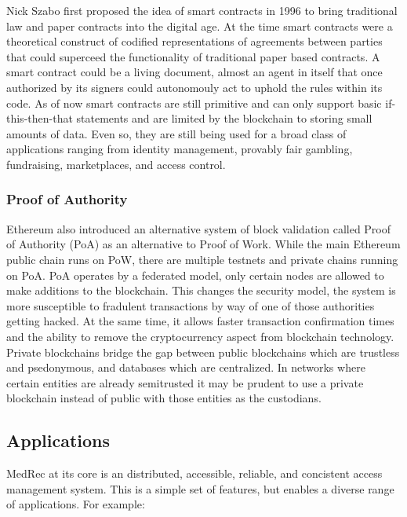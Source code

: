 \documentclass[a4paper]{article}
\begin{document}
Nick Szabo first proposed the idea of smart contracts in 1996 to bring traditional law and paper contracts into the digital age. At the time smart contracts were a theoretical construct of codified representations of agreements between parties that could superceed the functionality of traditional paper based contracts. A smart contract could be a living document, almost an agent in itself that once authorized by its signers could autonomouly act to uphold the rules within its code. As of now smart contracts are still primitive and can only support basic if-this-then-that statements and are limited by the blockchain to storing small amounts of data. Even so, they are still being used for a broad class of applications ranging from identity management, provably fair gambling, fundraising, marketplaces, and access control.

\subsubsection{Proof of Authority}

Ethereum also introduced an alternative system of block validation called Proof of Authority (PoA) as an alternative to Proof of Work. While the main Ethereum public chain runs on PoW, there are multiple testnets and private chains running on PoA. PoA operates by a federated model, only certain nodes are allowed to make additions to the blockchain. This changes the security model, the system is more susceptible to fradulent transactions by way of one of those authorities getting hacked. At the same time, it allows faster transaction confirmation times and the ability to remove the cryptocurrency aspect from blockchain technology. Private blockchains bridge the gap between public blockchains which are trustless and psedonymous, and databases which are centralized. In networks where certain entities are already semitrusted it may be prudent to use a private blockchain instead of public with those entities as the custodians.

\subsection{Applications}

MedRec at its core is an distributed, accessible, reliable, and concistent access management system. This is a simple set of features, but enables a diverse range of applications. For example:
\end{document}
